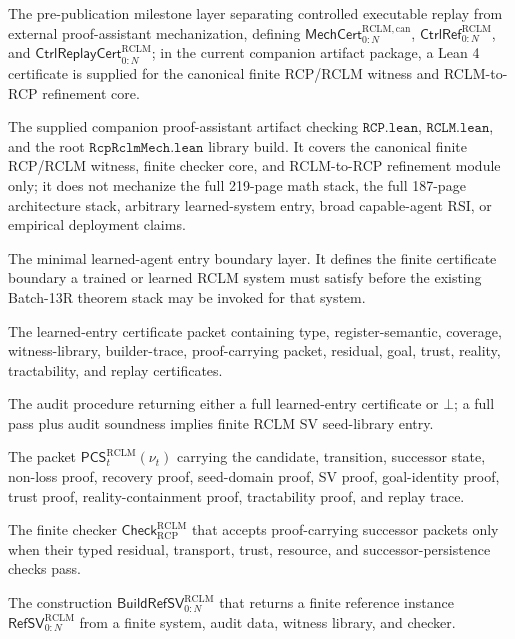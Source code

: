 \documentclass[11pt,a4paper]{article}
\newcommand{\RCP}{\mathrm{RCP}}
\newcommand{\RCLM}{\mathrm{RCLM}}
\begin{document}
\begin{description}[leftmargin=2.8cm, style=nextline]
    \item[Batch-13R-B] The pre-publication milestone layer separating controlled executable replay from external proof-assistant mechanization, defining \(\mathsf{MechCert}_{0:N}^{\RCLM,\mathrm{can}}\), \(\mathsf{CtrlRef}_{0:N}^{\RCLM}\), and \(\mathsf{CtrlReplayCert}_{0:N}^{\RCLM}\); in the current companion artifact package, a Lean 4 certificate is supplied for the canonical finite RCP/RCLM witness and RCLM-to-RCP refinement core.
    \item[Lean 4 certificate] The supplied companion proof-assistant artifact checking \(\texttt{RCP.lean}\), \(\texttt{RCLM.lean}\), and the root \(\texttt{RcpRclmMech.lean}\) library build.  It covers the canonical finite RCP/RCLM witness, finite checker core, and RCLM-to-RCP refinement module only; it does not mechanize the full 219-page math stack, the full 187-page architecture stack, arbitrary learned-system entry, broad capable-agent RSI, or empirical deployment claims.
    \item[M3-Min] The minimal learned-agent entry boundary layer. It defines the finite certificate boundary a trained or learned RCLM system must satisfy before the existing Batch-13R theorem stack may be invoked for that system.
    \item[\(\mathsf{LECert}_{0:N}^{\RCLM}\)] The learned-entry certificate packet containing type, register-semantic, coverage, witness-library, builder-trace, proof-carrying packet, residual, goal, trust, reality, tractability, and replay certificates.
    \item[\(\mathsf{LearnedEntryAudit}_{0:N}^{\RCLM}\)] The audit procedure returning either a full learned-entry certificate or \(\bot\); a full pass plus audit soundness implies finite RCLM SV seed-library entry.
    \item[RCLM proof-carrying successor packet] The packet \(\mathsf{PCS}_t^{\RCLM}(\nu_t)\) carrying the candidate, transition, successor state, non-loss proof, recovery proof, seed-domain proof, SV proof, goal-identity proof, trust proof, reality-containment proof, tractability proof, and replay trace.
    \item[RCLM reference checker] The finite checker \(\mathsf{Check}_{\RCP}^{\RCLM}\) that accepts proof-carrying successor packets only when their typed residual, transport, trust, resource, and successor-persistence checks pass.
    \item[RCLM reference builder] The construction \(\mathsf{BuildRefSV}_{0:N}^{\RCLM}\) that returns a finite reference instance \(\mathsf{RefSV}_{0:N}^{\RCLM}\) from a finite system, audit data, witness library, and checker.

\end{description}
\end{document}
